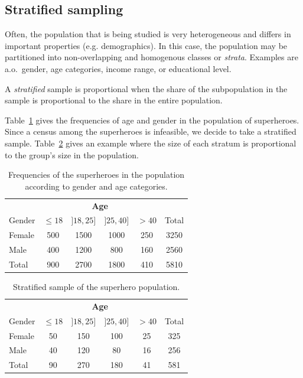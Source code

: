 \subsection{Stratified sampling}

Often, the population that is being studied is very heterogeneous and differs in important properties (e.g. demographics). In this case, the population may be partitioned into non-overlapping and homogenous classes or \emph{strata}. Examples are a.o.~gender, age categories, income range, or educational level.

\begin{definition}
A \emph{stratified} sample is proportional when the share of the subpopulation in the sample is proportional to the share in the entire population.
\end{definition}

\begin{example}
  Table~\ref{tab:heldenPopulatie1} gives the frequencies of age and gender in the population of superheroes. Since a census among the superheroes is infeasible, we decide to take a stratified sample. Table~\ref{tab:heldenPopulatie2} gives an example where the size of each stratum is proportional to the group's size in the population.
\end{example}

  \begin{table}
  \centering
    \begin{tabular}{l|cccc|c}
      & \multicolumn{4}{c|}{\textbf{Age}} & \\
      Gender & $\le 18$ & $]18,25]$ & $]25, 40]$ & $> 40$ & Total\\
      \hline
      Female & 500 & 1500 & 1000 & 250 & 3250 \\
      Male   & 400 & 1200 & 800 & 160 & 2560\\
      \hline
      Total  & 900 & 2700 & 1800 & 410 & 5810
    \end{tabular}
    \caption{Frequencies of the superheroes in the population according to gender and age categories.}
    \label{tab:heldenPopulatie1}
\end{table}

\begin{table}
  \centering
    \begin{tabular}{l|cccc|c}
      & \multicolumn{4}{c|}{\textbf{Age}} & \\
      Gender & $\le 18$ & $]18,25]$ & $]25, 40]$ & $> 40$ & Total\\
      \hline
      Female & 50 & 150 & 100 & 25 & 325 \\
      Male   & 40 & 120 & 80 & 16 & 256\\
      \hline
      Total & 90 & 270 & 180 & 41 & 581
    \end{tabular}
      \caption{Stratified sample of the superhero population.}
    \label{tab:heldenPopulatie2}
  \end{table}


